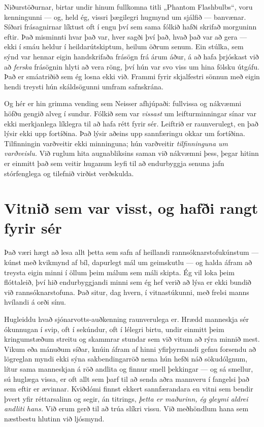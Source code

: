 Niðurstöðurnar, birtar undir hinum fullkomna titli „Phantom Flashbulbs“, voru kenningunni — og, held ég, vissri þægilegri hugmynd um sjálfið — banvænar. Síðari frásagnirnar líktust oft í engu því sem sama fólkið hafði skrifað morguninn eftir. Það misminnti hvar það var, hver sagði því það, hvað það var að gera — ekki í smáu heldur í heildarútskiptum, heilum öðrum senum. Ein stúlka, sem sýnd var hennar eigin handskrifaða frásögn frá árum áður, á að hafa þrjóskast við að \emph{ferska} frásögnin hlyti að vera röng, því hún var svo viss um hina fölsku útgáfu. Það er smáatriðið sem ég losna ekki við. Frammi fyrir skjalfestri sönnun með eigin hendi treysti hún skáldsögunni umfram safnskrána.

Og hér er hin grimma vending sem Neisser afhjúpaði: fullvissa og nákvæmni höfðu gengið alveg í sundur. Fólkið sem var \emph{vissast} um leifturminningar sínar var ekki merkjanlega líklegra til að hafa rétt fyrir sér. Leiftrið er raunverulegt, en það lýsir ekki upp fortíðina. Það lýsir aðeins upp sannfæringu okkar um fortíðina. Tilfinningin varðveitir ekki minninguna; hún varðveitir \emph{tilfinninguna um varðveislu.} Við ruglum hita augnabliksins saman við nákvæmni þess, þegar hitinn er einmitt það sem veitir huganum leyfi til að endurbyggja senuna jafn stórfenglega og tilefnið virðist verðskulda.

\section*{Vitnið sem var visst, og hafði rangt fyrir sér}

Það væri hægt að lesa allt þetta sem safn af heillandi rannsóknarstofukúnstum — kúnst með kvikmynd af bíl, dapurlegt mál um geimskutlu — og halda áfram að treysta eigin minni í öllum þeim málum sem máli skipta. Ég vil loka þeim flóttaleið, því hið endurbyggjandi minni sem ég hef verið að lýsa er ekki bundið við rannsóknarstofuna. Það situr, dag hvern, í vitnastúkunni, með frelsi manns hvílandi á orði sínu.

Hugleiddu hvað sjónarvotts-auðkenning raunverulega er. Hrædd manneskja sér ókunnugan í svip, oft í sekúndur, oft í lélegri birtu, undir einmitt þeim kringumstæðum streitu og skammrar stundar sem við vitum að rýra minnið mest. Vikum eða mánuðum síðar, knúin áfram af hinni yfirþyrmandi gefnu forsendu að lögreglan myndi ekki sýna sakbendingarröð nema hún hefði náð sökudólgnum, lítur sama manneskjan á röð andlita og finnur smell þekkingar — og sá smellur, sú huglæga vissa, er oft allt sem þarf til að senda aðra mannveru í fangelsi það sem eftir er ævinnar. Kviðdómi finnst ekkert sannfærandara en vitni sem bendir þvert yfir réttarsalinn og segir, án titrings, \emph{þetta er maðurinn, ég gleymi aldrei andliti hans.} Við erum gerð til að trúa slíkri vissu. Við meðhöndlum hana sem næstbestu hlutinn við ljósmynd.

